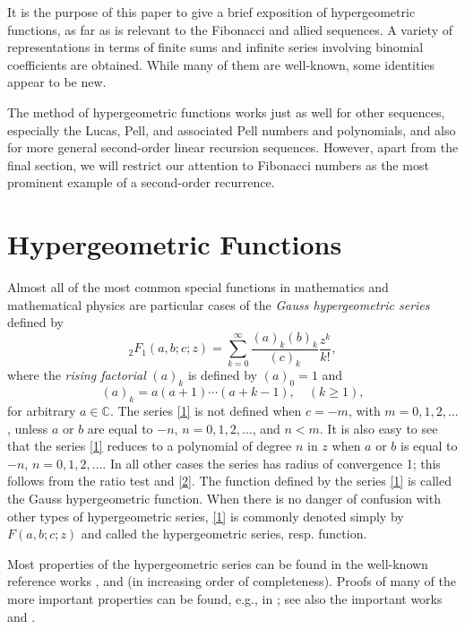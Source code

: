 \documentclass[11pt,reqno]{amsart}
\newcommand{\C}{{\mathbb C}}
\theoremstyle{plain}
\numberwithin{equation}{section}
\begin{document}
It is the purpose of this paper to give a brief exposition of
hypergeometric functions, as far as is relevant to the Fibonacci and
allied sequences.  A variety of representations in terms of finite
sums and infinite series involving binomial coefficients are
obtained.  While many of them are well-known, some identities appear
to be new.

The method of hypergeometric functions works just as well for other
sequences, especially the Lucas, Pell, and associated Pell numbers
and polynomials, and also for more general second-order linear
recursion sequences.  However, apart from the final section, we will
restrict our attention to Fibonacci numbers as the most prominent
example of a second-order recurrence.

\section{Hypergeometric Functions}

Almost all of the most common special functions in mathematics and
mathematical physics are particular cases of the \textit{Gauss
hypergeometric series} defined by
\begin{equation}\label{1}
_2 F _1 (a,b; c; z) = \sum_{k=0}^\infty \frac{(a)_k (b)_k}{(c)_k}
\frac{z^k}{k!} ,
\end{equation}
where the \textit{rising factorial} $(a)_k$ is defined by $(a)_0 =
1$ and
\begin{equation}\label{2}
(a)_k = a(a+1) \cdots (a+k-1), \quad (k \ge 1) ,
\end{equation}
for arbitrary $a \in \C$.  The series \eqref{1} is not defined when
$c = -m$, with $m=0, 1, 2, \ldots$, unless $a$ or $b$ are equal to
$-n$, $n = 0, 1, 2, \ldots$, and $n < m$.  It is also easy to see
that the series \eqref{1} reduces to a polynomial of degree $n$ in
$z$ when $a$ or $b$ is equal to $-n$, $n=0, 1, 2, \ldots$.  In all
other cases the series has radius of convergence 1; this follows
from the ratio test and \eqref{2}.  The function defined by the
series \eqref{1} is called the Gauss hypergeometric function.  When
there is no danger of confusion with other types of hypergeometric
series, \eqref{1} is commonly denoted simply by $F(a, b; c; z)$ and
called the hypergeometric series, resp. function.

Most properties of the hypergeometric series can be found in the
well-known reference works \cite{abram}, \cite{magnus} and
\cite{erdelyi} (in increasing order of completeness).  Proofs of
many of the more important properties can be found, e.g., in
\cite{rainville}; see also the important works \cite{bailey} and
\cite{slater}.
\end{document}
